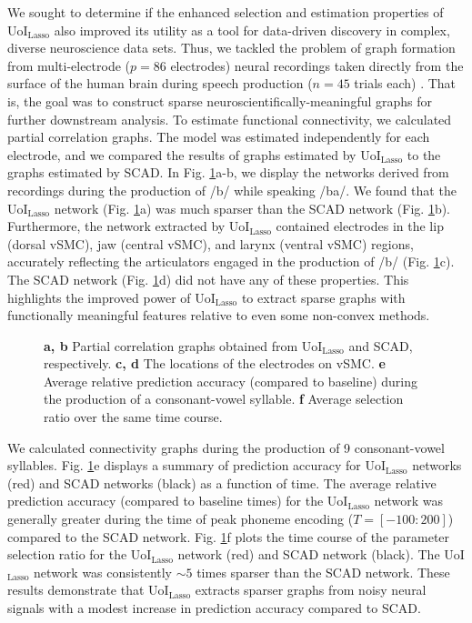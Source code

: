 \documentclass[letterpaper, 10 pt, conference]{ieeeconf}  %
\begin{document}
We sought to determine if the enhanced selection and estimation properties of UoI$_{\text{Lasso}}$ also improved its utility as a tool for data-driven discovery in complex, diverse neuroscience data sets. Thus, we tackled the problem of graph formation from multi-electrode ($p=86$ electrodes) neural recordings taken directly from the surface of the human brain during speech production ($n=45$ trials each) \cite{bouchard2013}. That is, the goal was to construct sparse neuroscientifically-meaningful graphs for further downstream analysis. To estimate functional connectivity, we calculated partial correlation graphs. The model was estimated independently for each electrode, and we compared the results of graphs estimated by UoI$_{\text{Lasso}}$ to the graphs estimated by SCAD. In Fig. \ref{fig:vsmc}a-b, we display the networks derived from recordings during the production of /b/ while speaking /ba/. We found that the UoI$_{\text{Lasso}}$ network (Fig. \ref{fig:vsmc}a) was much sparser than the SCAD network (Fig. \ref{fig:vsmc}b). Furthermore, the network extracted by UoI$_{\text{Lasso}}$ contained electrodes in the lip (dorsal vSMC), jaw (central vSMC), and larynx (ventral vSMC) regions, accurately reflecting the articulators engaged in the production of /b/ (Fig. \ref{fig:vsmc}c). The SCAD network (Fig. \ref{fig:vsmc}d) did not have any of these properties. This highlights the improved power of UoI$_{\text{Lasso}}$ to extract sparse graphs with functionally meaningful features relative to even some non-convex methods.
\begin{figure}[t!]
    \centering
    \caption{\textbf{a, b} Partial correlation graphs obtained from UoI$_{\text{Lasso}}$ and SCAD, respectively. \textbf{c, d} The locations of the electrodes on vSMC. \textbf{e} Average relative prediction accuracy (compared to baseline) during the production of a consonant-vowel syllable. \textbf{f} Average selection ratio over the same time course.}
    \label{fig:vsmc}
\end{figure}

We calculated connectivity graphs during the production of 9 consonant-vowel syllables. Fig. \ref{fig:vsmc}e displays a summary of prediction accuracy for UoI$_{\text{Lasso}}$ networks (red) and SCAD networks (black) as a function of time. The average relative prediction accuracy (compared to baseline times) for the UoI$_{\text{Lasso}}$ network was generally greater during the time of peak phoneme encoding ($T = \left[-100:200\right]$) compared to the SCAD network. Fig. \ref{fig:vsmc}f plots the time course of the parameter selection ratio for the UoI$_{\text{Lasso}}$ network (red) and SCAD network (black). The UoI$_{\text{Lasso}}$ network was consistently $\sim5$ times sparser than the SCAD network. These results demonstrate that UoI$_{\text{Lasso}}$ extracts sparser graphs from noisy neural signals with a modest increase in prediction accuracy compared to SCAD.
\end{document}
